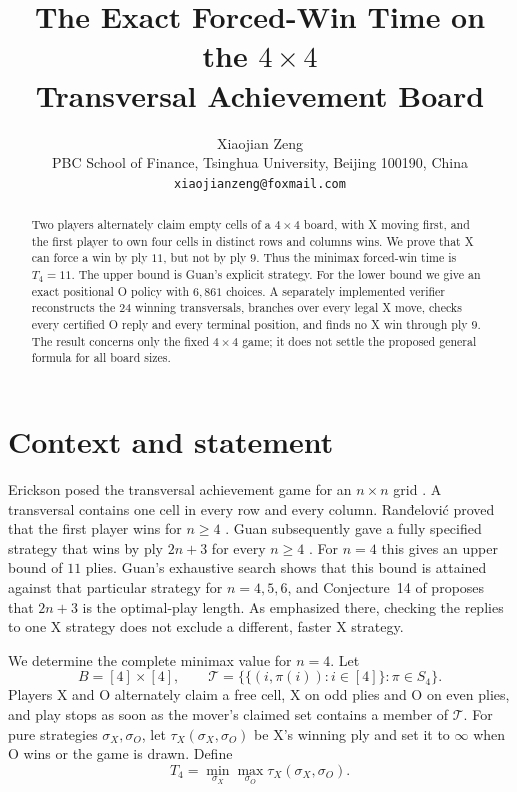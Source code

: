 \documentclass[11pt]{article}
\title{The Exact Forced-Win Time on the $4\times4$\\
Transversal Achievement Board}
\author{Xiaojian Zeng\\
\small PBC School of Finance, Tsinghua University, Beijing 100190, China\\
\small \texttt{xiaojianzeng@foxmail.com}}
\date{}
\newcommand{\Tfour}{T_4}
\begin{document}
\maketitle

\begin{abstract}
Two players alternately claim empty cells of a $4\times4$ board, with X
moving first, and the first player to own four cells in distinct rows and
columns wins.  We prove that X can force a win by ply $11$, but not by ply
$9$.  Thus the minimax forced-win time is $\Tfour=11$.  The upper bound is
Guan's explicit strategy.  For the lower bound we give an exact positional O
policy with $6{,}861$ choices.  A separately implemented verifier reconstructs
the $24$ winning transversals, branches over every legal X move, checks every
certified O reply and every terminal position, and finds no X win through ply
$9$.  The result concerns only the fixed $4\times4$ game; it does not settle
the proposed general formula for all board sizes.
\end{abstract}

\section{Context and statement}

Erickson posed the transversal achievement game for an $n\times n$ grid
\cite{Erickson2010}.  A transversal contains one cell in every row and every
column.  Ranđelović proved that the first player wins for $n\geq4$
\cite{Randjelovic2025}.  Guan subsequently gave a fully specified strategy
that wins by ply $2n+3$ for every $n\geq4$ \cite{Guan2026}.  For $n=4$ this
gives an upper bound of $11$ plies.  Guan's exhaustive search shows that this
bound is attained against that particular strategy for $n=4,5,6$, and
Conjecture~14 of \cite{Guan2026} proposes that $2n+3$ is the optimal-play
length.  As emphasized there, checking the replies to one X strategy does not
exclude a different, faster X strategy.

We determine the complete minimax value for $n=4$.  Let
\[
 B=[4]\times[4],\qquad
 \mathcal T=\bigl\{\{(i,\pi(i)):i\in[4]\}:\pi\in S_4\bigr\}.
\]
Players X and O alternately claim a free cell, X on odd plies and O on even
plies, and play stops as soon as the mover's claimed set contains a member of
$\mathcal T$.  For pure strategies $\sigma_X,\sigma_O$, let
$\tau_X(\sigma_X,\sigma_O)$ be X's winning ply and set it to $\infty$ when O
wins or the game is drawn.  Define
\[
 \Tfour=\min_{\sigma_X}\max_{\sigma_O}
 \tau_X(\sigma_X,\sigma_O).
\]
\end{document}
